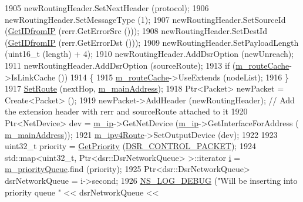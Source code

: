 \begin{DoxyCode}
1905                   newRoutingHeader.SetNextHeader (protocol);
1906                   newRoutingHeader.SetMessageType (1);
1907                   newRoutingHeader.SetSourceId (\hyperlink{classns3_1_1dsr_1_1DsrRouting_a4593e50d5f36e9b9b013fe0422067c44}{GetIDfromIP} (rerr.GetErrorSrc ()));
1908                   newRoutingHeader.SetDestId (\hyperlink{classns3_1_1dsr_1_1DsrRouting_a4593e50d5f36e9b9b013fe0422067c44}{GetIDfromIP} (rerr.GetErrorDst ()));
1909                   newRoutingHeader.SetPayloadLength (uint16\_t (length) + 4);
1910                   newRoutingHeader.AddDsrOption (newUnreach);
1911                   newRoutingHeader.AddDsrOption (sourceRoute);
1913                   \textcolor{keywordflow}{if} (\hyperlink{classns3_1_1dsr_1_1DsrRouting_ac409bdb961b9fff0fb63ebd026be99ad}{m\_routeCache}->IsLinkCache ())
1914                     \{
1915                       \hyperlink{classns3_1_1dsr_1_1DsrRouting_ac409bdb961b9fff0fb63ebd026be99ad}{m\_routeCache}->UseExtends (nodeList);
1916                     \}
1917                   \hyperlink{classns3_1_1dsr_1_1DsrRouting_a8a726fb52558a1a8172a5bd5b8cdb072}{SetRoute} (nextHop, \hyperlink{classns3_1_1dsr_1_1DsrRouting_a73182b5edee2d8460f28855e058fc9a0}{m\_mainAddress});
1918                   Ptr<Packet> newPacket = Create<Packet> ();
1919                   newPacket->AddHeader (newRoutingHeader);       \textcolor{comment}{// Add the extension header with rerr and
       sourceRoute attached to it}
1920                   Ptr<NetDevice> dev = \hyperlink{classns3_1_1dsr_1_1DsrRouting_a0443d48172143cafa1d0491e35f3fbaf}{m\_ip}->GetNetDevice (\hyperlink{classns3_1_1dsr_1_1DsrRouting_a0443d48172143cafa1d0491e35f3fbaf}{m\_ip}->GetInterfaceForAddress (
      \hyperlink{classns3_1_1dsr_1_1DsrRouting_a73182b5edee2d8460f28855e058fc9a0}{m\_mainAddress}));
1921                   \hyperlink{classns3_1_1dsr_1_1DsrRouting_ab4c16d56044159989e52ad33c0afed2b}{m\_ipv4Route}->SetOutputDevice (dev);
1922 
1923                   uint32\_t priority = \hyperlink{classns3_1_1dsr_1_1DsrRouting_a67d111b0188b6e2210d1b4782820f8e3}{GetPriority} (\hyperlink{namespacens3_1_1dsr_a7c80bcec67d78dc149a0e503014d07c5abeaa53bf31d961c221e4e377ef6022f2}{DSR\_CONTROL\_PACKET});
1924                   std::map<uint32\_t, Ptr<dsr::DsrNetworkQueue> >::iterator \hyperlink{bernuolliDistribution_8m_a6f6ccfcf58b31cb6412107d9d5281426}{i} = 
      \hyperlink{classns3_1_1dsr_1_1DsrRouting_a4606c3dfb1099afbfe1e7cd1d1c3c8ee}{m\_priorityQueue}.find (priority);
1925                   Ptr<dsr::DsrNetworkQueue> dsrNetworkQueue = i->second;
1926                   \hyperlink{group__logging_ga413f1886406d49f59a6a0a89b77b4d0a}{NS\_LOG\_DEBUG} (\textcolor{stringliteral}{"Will be inserting into priority queue "} << dsrNetworkQueue << \textcolor{stringliteral}{
}
\end{DoxyCode}
